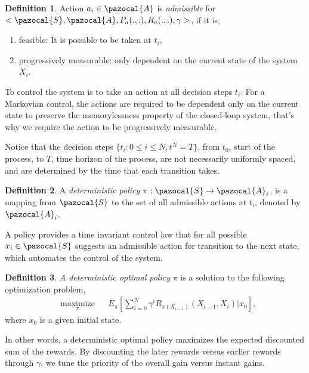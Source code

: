 \documentclass[12pt]{aastex62}
\theoremstyle{definition}
\newtheorem{defn}{Definition}
\begin{document}
\begin{defn}
Action $a_{i} \in \pazocal{A}$ is \textit{admissible} for $<\pazocal{S},\pazocal{A}, P_a(.,.), R_a(.,.), \gamma>$, if it is,
\begin{enumerate}
\item feasible: It is possible to be taken at $t_i$,
\item progressively measurable: only dependent on the current state of the system $X_i$.
\end{enumerate}
\end{defn}

To control the system is to take an action at all decision steps $t_i$. For a Markovian control, the actions are required to be dependent only on the current state to preserve the memorylessness property of the closed-loop system, that's why we require the action to be progressively measurable.

Notice that the decision steps $\{ t_i: 0 \leq i \leq N, t^N  =T\}$, from $t_0$, start of the process, to $T$, time horizon of the process, are not necessarily uniformly spaced, and are determined by the time that each transition takes. 

\begin{defn}
A \textit{deterministic policy} $\pi : \pazocal{S} \rightarrow \pazocal{A}_i$, is a mapping from $\pazocal{S}$ to the set of all admissible actions at $t_i$, denoted by $\pazocal{A}_i$. 
\end{defn}

A policy provides a time invariant control law that for all possible $x_i \in \pazocal{S}$ suggests an admissible action for transition to the next state, which automates the control of the system.

\begin{defn}
\textit{A deterministic optimal policy} $\pi$ is a solution to the following optimization problem,
\begin{equation}\label{equ_opt1}
\begin{aligned}
& \underset{\pi}{\text{maximize}}
& & E_{\pi}[\sum_{i = 0}^N \gamma^i R_{\pi(X_{i-1})}(X_{i-1}, X_{i}) | x_0],
\end{aligned}
\end{equation}
where $x_0$ is a given initial state.
\end{defn}

In other words, a deterministic optimal policy maximizes the expected discounted sum of the rewards. By discounting the later rewards versus earlier rewards through $\gamma$, we tune the priority of the overall gain versus instant gains.
\end{document}
